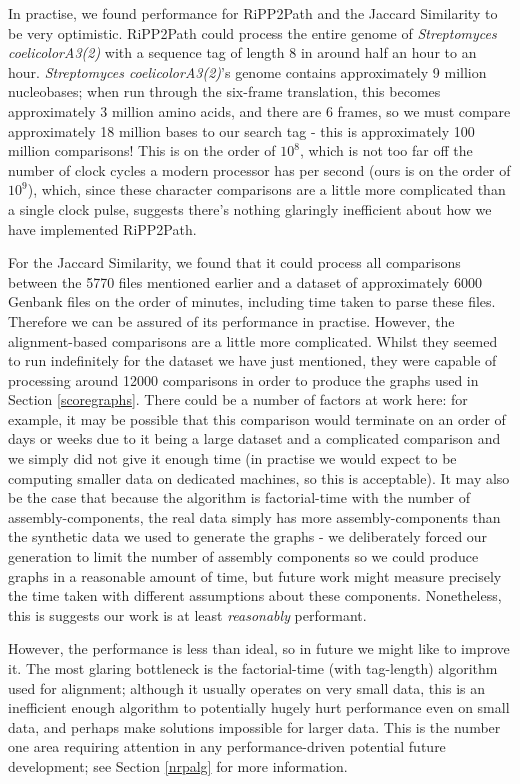 \documentclass{l4proj}
\begin{document}
In practise, we found performance for RiPP2Path and the Jaccard Similarity to be very optimistic. RiPP2Path could process the entire genome of \textit{Streptomyces coelicolorA3(2)} with a sequence tag of length 8 in around half an hour to an hour. \textit{Streptomyces coelicolorA3(2)}'s genome contains approximately 9 million nucleobases; when run through the six-frame translation, this becomes approximately 3 million amino acids, and there are 6 frames, so we must compare approximately 18 million bases to our search tag - this is approximately 100 million comparisons! This is on the order of \(10^8\), which is not too far off the number of clock cycles a modern processor has per second (ours is on the order of \(10^9\)), which, since these character comparisons are a little more complicated than a single clock pulse, suggests there's nothing glaringly inefficient about how we have implemented RiPP2Path.

For the Jaccard Similarity, we found that it could process all comparisons between the 5770 files mentioned earlier and a dataset of approximately 6000 Genbank files on the order of minutes, including time taken to parse these files. Therefore we can be assured of its performance in practise. However, the alignment-based comparisons are a little more complicated. Whilst they seemed to run indefinitely for the dataset we have just mentioned, they were capable of processing around 12000 comparisons in order to produce the graphs used in Section \ref{scoregraphs}. There could be a number of factors at work here: for example, it may be possible that this comparison would terminate on an order of days or weeks due to it being a large dataset and a complicated comparison and we simply did not give it enough time (in practise we would expect to be computing smaller data on dedicated machines, so this is acceptable). It may also be the case that because the algorithm is factorial-time with the number of assembly-components, the real data simply has more assembly-components than the synthetic data we used to generate the graphs - we deliberately forced our generation to limit the number of assembly components so we could produce graphs in a reasonable amount of time, but future work might measure precisely the time taken with different assumptions about these components. Nonetheless, this is suggests our work is at least \textit{reasonably} performant.

However, the performance is less than ideal, so in future we might like to improve it. The most glaring bottleneck is the factorial-time (with tag-length) algorithm used for alignment; although it usually operates on very small data, this is an inefficient enough algorithm to potentially hugely hurt performance even on small data, and perhaps make solutions impossible for larger data. This is the number one area requiring attention in any performance-driven potential future development; see Section \ref{nrpalg} for more information.
\end{document}
